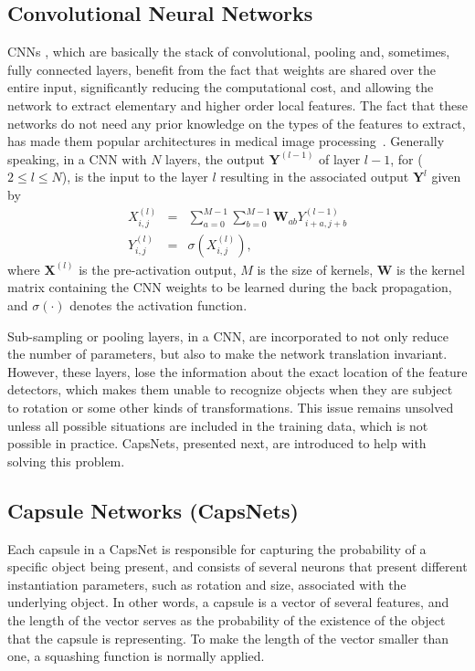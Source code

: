 \documentclass{article}
\def\X{\bm{X}}
\def\Y{\bm{Y}}
\def\W{\bm{W}}
\begin{document}
\subsection{Convolutional Neural Networks} \label{sec:conv}
CNNs \cite{Lecun:1998}, which are basically the stack of convolutional, pooling and, sometimes, fully connected layers, benefit from the fact that weights are shared over the entire input, significantly reducing the computational cost,  and allowing the network to extract elementary and higher order local features. The fact that these networks do not need any prior knowledge on the types of the features to extract, has made them popular architectures in medical image processing~\cite{Ravi:2017}. Generally speaking, in a CNN with $N$ layers, the output $\Y^{(l-1)}$ of layer $l-1$, for ($2 \leq l \leq N$),  is the input to the layer $l$ resulting in the associated output $\Y^l$ given by
%
\begin{eqnarray}
X^{(l)}_{i, j} &=& \sum_{a=0}^{M-1}\sum_{b=0}^{M-1}\W_{ab}Y^{(l-1)}_{i+a, j+b}\\
Y^{(l)}_{i, j} &=& \sigma (X^{(l)}_{i,j}),
\end{eqnarray}
%
where $\X^{(l)}$ is the pre-activation output, $M$ is the size of kernels, $\W$ is the kernel matrix containing the CNN weights to be learned during the back propagation, and $\sigma(\cdot)$ denotes the activation function.

Sub-sampling or pooling layers, in a CNN, are incorporated to not only reduce the number of parameters, but also to make the network translation invariant. However, these layers, lose the information about the exact location of the feature detectors, which makes them unable to recognize objects when they are subject to rotation or some other kinds of transformations. This issue remains unsolved unless all possible situations are included in the training data, which is not possible in practice. CapsNets, presented next, are introduced to help with solving this problem.

\subsection{Capsule Networks (CapsNets)} \label{sec:caps}
Each capsule in a CapsNet is responsible for capturing the probability of a specific object being present, and consists of several neurons that present different instantiation parameters, such as rotation and size, associated with the underlying object. In other words, a capsule is a vector of several features, and the length of the vector serves as the probability of the existence of the object that the capsule is representing. To make the length of the vector smaller than one, a squashing function is normally applied.
\end{document}
